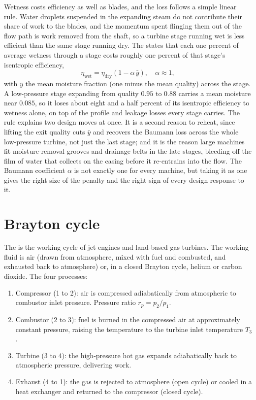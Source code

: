 \begin{mastery}
Wetness costs efficiency as well as blades, and the loss follows a simple linear
rule. Water droplets suspended in the expanding steam do not contribute their
share of work to the blades, and the momentum spent flinging them out of the flow
path is work removed from the shaft, so a turbine stage running wet is less
efficient than the same stage running dry. The  states that
each one percent of average wetness through a stage costs roughly one percent of
that stage's isentropic efficiency,
\[
\eta_{\text{wet}} = \eta_{\text{dry}}\left(1 - \alpha\,\bar{y}\right),
\quad \alpha \approx 1,
\]
with $\bar{y}$ the mean moisture fraction (one minus the mean quality) across the
stage. A low-pressure stage expanding from quality $0.95$ to $0.88$ carries a mean
moisture near $0.085$, so it loses about eight and a half percent of its
isentropic efficiency to wetness alone, on top of the profile and leakage losses
every stage carries. The rule explains two design moves at once. It is a second
reason to reheat, since lifting the exit quality cuts $\bar{y}$ and recovers the
Baumann loss across the whole low-pressure turbine, not just the last stage; and
it is the reason large machines fit moisture-removal grooves and drainage belts in
the late stages, bleeding off the film of water that collects on the casing before
it re-entrains into the flow. The Baumann coefficient $\alpha$ is not exactly one
for every machine, but taking it as one gives the right size of the penalty and
the right sign of every design response to it.
\end{mastery}

\section{Brayton cycle}

The  is the working cycle of jet engines and
land-based gas turbines. The working fluid is air (drawn from
atmosphere, mixed with fuel and combusted, and exhausted back to
atmosphere) or, in a closed Brayton cycle, helium or carbon dioxide.
The four processes:

\begin{enumerate}[leftmargin=*]
  \item Compressor (1 to 2): air is compressed adiabatically from
    atmospheric to combustor inlet pressure. Pressure ratio $r_p =
    p_2/p_1$.
  \item Combustor (2 to 3): fuel is burned in the compressed air at
    approximately constant pressure, raising the temperature to the
    turbine inlet temperature $T_3$.
  \item Turbine (3 to 4): the high-pressure hot gas expands
    adiabatically back to atmospheric pressure, delivering work.
  \item Exhaust (4 to 1): the gas is rejected to atmosphere (open
    cycle) or cooled in a heat exchanger and returned to the
    compressor (closed cycle).
\end{enumerate}

